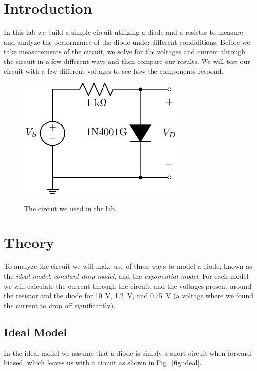 \documentclass{../../ece-report}
\begin{document}
\maketitle
\section{Introduction}

In this lab we build a simple circuit utilizing a diode
and a resistor to measure and analyze the performance
of the diode under different condiditions. Before we
take measurements of the circuit, we solve for the voltages
and current through the circuit in a few different ways
and then compare our results. We will test our circuit
with a few different voltages to see how the components
respond.

\begin{figure}[h!]
  \centering
  \includegraphics{../circuits/circuit1.pdf}
  \label{fig:circuit}
  \caption{The circuit we used in the lab.}
\end{figure}


\section{Theory}

To analyze the circuit we will make use of three ways
to model a diode, known as the \emph{ideal model}, \emph{constant
drop model}, and the \emph{exponential model}. For each
model we will calculate the current through the circuit,
and the voltages present around the resistor and the
diode for 10~V, 1.2~V, and 0.75~V (a voltage where we
found the current to drop off significantly).

\subsection{Ideal Model}

In the ideal model we assume that a diode is simply
a short circuit when forward biased, which leaves us
with a circuit as shown in Fig.~\ref{fig:ideal}.
\end{document}

